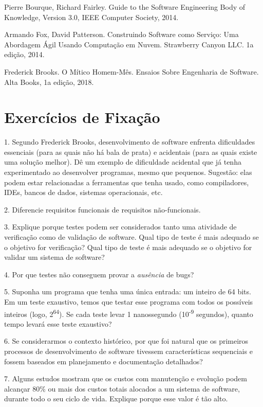 \documentclass[
  11pt,
  twoside]{book}
\begin{document}
Pierre Bourque, Richard Fairley. Guide to the Software Engineering Body
of Knowledge, Version 3.0, IEEE Computer Society, 2014.

Armando Fox, David Patterson. Construindo Software como Serviço: Uma
Abordagem Ágil Usando Computação em Nuvem. Strawberry Canyon LLC. 1a
edição, 2014.

Frederick Brooks. O Mítico Homem-Mês. Ensaios Sobre Engenharia de
Software. Alta Books, 1a edição, 2018.

\hypertarget{exercuxedcios-de-fixauxe7uxe3o}{%
\section*{Exercícios de Fixação}\label{exercuxedcios-de-fixauxe7uxe3o}}

1. Segundo Frederick Brooks, desenvolvimento de software enfrenta
dificuldades essenciais (para as quais não há bala de prata) e
acidentais (para as quais existe uma solução melhor). Dê um exemplo de
dificuldade acidental que já tenha experimentado ao desenvolver
programas, mesmo que pequenos. Sugestão: elas podem estar relacionadas a
ferramentas que tenha usado, como compiladores, IDEs, bancos de dados,
sistemas operacionais, etc.

2. Diferencie requisitos funcionais de requisitos não-funcionais.

3. Explique porque testes podem ser considerados tanto uma atividade de
verificação como de validação de software. Qual tipo de teste é mais
adequado se o objetivo for verificação? Qual tipo de teste é mais
adequado se o objetivo for validar um sistema de software?

4. Por que testes não conseguem provar a \emph{ausência} de bugs?

5. Suponha um programa que tenha uma única entrada: um inteiro de 64
bits. Em um teste exaustivo, temos que testar esse programa com todos os
possíveis inteiros (logo, 2\textsuperscript{64}). Se cada teste levar 1
nanossegundo (10\textsuperscript{-9} segundos), quanto tempo levará esse
teste exaustivo?

6. Se considerarmos o contexto histórico, por que foi natural que os
primeiros processos de desenvolvimento de software tivessem
características sequenciais e fossem baseados em planejamento e
documentação detalhados?

7. Alguns estudos mostram que os custos com manutenção e evolução podem
alcançar 80\% ou mais dos custos totais alocados a um sistema de
software, durante todo o seu ciclo de vida. Explique porque esse valor é
tão alto.
\end{document}
